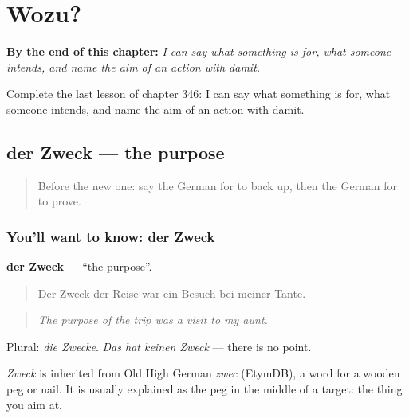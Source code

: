 
\chapter{Wozu?}
\label{ch:ge-wozu}

\begin{chapteropening}
\textbf{By the end of this chapter:} \emph{I can say what something is for, what someone intends, and name the aim of an action with damit.}

Complete the last lesson of chapter 346: I can say what something is for, what someone intends, and name the aim of an action with damit.
\end{chapteropening}

\section[der Zweck]{der Zweck — the purpose}

\label{lesson:GE-C346-zweck}



\begin{quote}
Before the new one: say the German for to back up, then the German for to prove.
\end{quote}

\subsection*{You'll want to know: der Zweck}
\textbf{der Zweck} — \textquotedblleft{}the purpose\textquotedblright{}.

\begin{quote}
Der Zweck der Reise war ein Besuch bei meiner Tante.
\end{quote}

\begin{quote}
\emph{The purpose of the trip was a visit to my aunt.}
\end{quote}

Plural: \emph{die Zwecke}. \emph{Das hat keinen Zweck} — there is no point.

\begin{cousinweb}
\emph{Zweck} is inherited from Old High German \emph{zwec} (EtymDB), a word for a wooden peg or nail. It is usually explained as the peg in the middle of a target: the thing you aim at.
\end{cousinweb}


